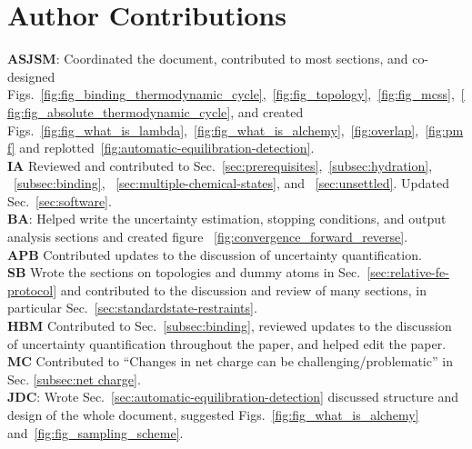 \documentclass[9pt,bestpractices]{livecoms}
\begin{document}
\section*{Author Contributions}
%
\textbf{ASJSM}: Coordinated the document, contributed to most sections, and co-designed Figs.~\ref{fig:fig_binding_thermodynamic_cycle},~\ref{fig:fig_topology},~\ref{fig:fig_mcss},~\ref{fig:fig_absolute_thermodynamic_cycle}, and created Figs.~\ref{fig:fig_what_is_lambda},~\ref{fig:fig_what_is_alchemy},~\ref{fig:overlap},~\ref{fig:pmf} and replotted~\ref{fig:automatic-equilibration-detection}.\\
\textbf{IA} Reviewed and contributed to Sec.~\ref{sec:prerequisites},~\ref{subsec:hydration}, ~\ref{subsec:binding}, ~\ref{sec:multiple-chemical-states}, and ~\ref{sec:unsettled}. Updated Sec.~\ref{sec:software}.\\
\textbf{BA}: Helped write the uncertainty estimation, stopping conditions, and output analysis sections and created figure ~\ref{fig:convergence_forward_reverse}.\\
\textbf{APB} Contributed updates to the discussion of uncertainty quantification.\\
\textbf{SB} Wrote the sections on topologies and dummy atoms in Sec.~\ref{sec:relative-fe-protocol} and contributed to the discussion and review of many sections, in particular Sec.~\ref{sec:standardstate-restraints}.\\
\textbf{HBM} Contributed to Sec.~\ref{subsec:binding}, reviewed updates to the discussion of uncertainty quantification throughout the paper, and helped edit the paper.\\
\textbf{MC} Contributed to ``Changes in net charge can be challenging/problematic'' in Sec. \ref{subsec:net charge}. \\
\textbf{JDC}: Wrote Sec.~\ref{sec:automatic-equilibration-detection} discussed structure and design of the whole document, suggested Figs.~\ref{fig:fig_what_is_alchemy} and~\ref{fig:fig_sampling_scheme}. \\
\end{document}
